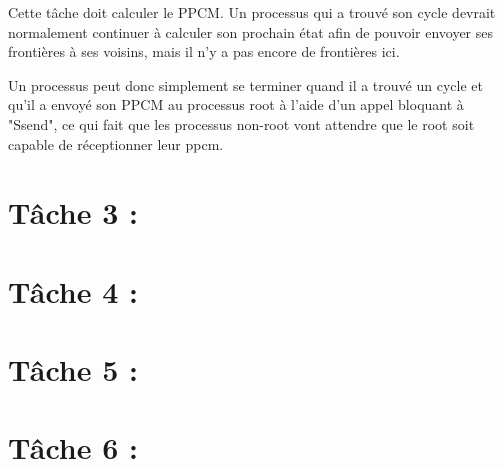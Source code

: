 \documentclass{article}
\begin{document}
Cette tâche doit calculer le PPCM.
Un processus qui a trouvé son cycle devrait normalement continuer à calculer son prochain état afin de pouvoir envoyer ses frontières à ses voisins, mais il n'y a pas encore de frontières ici.

Un processus peut donc simplement se terminer quand il a trouvé un cycle et qu'il a envoyé son PPCM au processus root à l'aide d'un appel bloquant à "Ssend", ce qui fait que les processus non-root vont attendre que le root soit capable de réceptionner leur ppcm.

\section*{Tâche 3 :}
\section*{Tâche 4 :}
\section*{Tâche 5 :}
\section*{Tâche 6 :}
\end{document}
